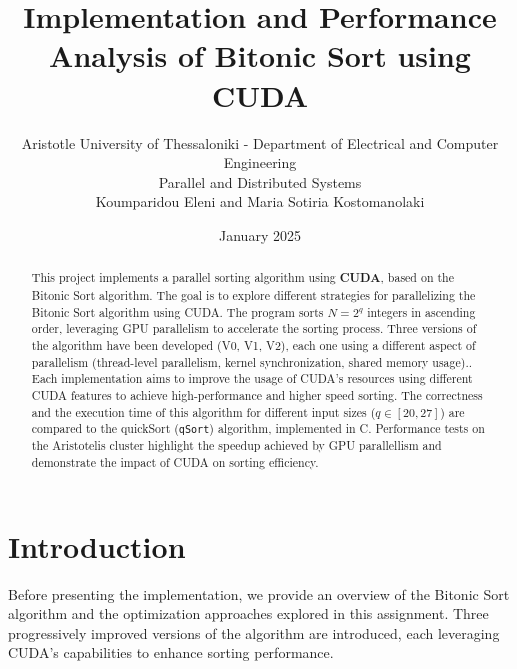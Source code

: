 \documentclass[a4paper,12pt]{article}
\title{Implementation and Performance Analysis of Bitonic Sort using CUDA}
\author{
    \small Aristotle University of Thessaloniki - Department of Electrical and Computer Engineering \\[0.5em]
    \small Parallel and Distributed Systems\\[1.5em]
    Koumparidou Eleni and Maria Sotiria Kostomanolaki \\[1em]
}
\date{January 2025}
\begin{document}
\maketitle

\begin{abstract}
This project implements a parallel sorting algorithm using \textbf{CUDA}, based on the Bitonic Sort algorithm. The goal is to explore different strategies for parallelizing the Bitonic Sort algorithm using CUDA. The program sorts $N = 2^q$ integers in ascending order, leveraging GPU parallelism to accelerate the sorting process. Three versions of the algorithm have been developed (V0, V1, V2), each one using a different aspect of parallelism (thread-level parallelism, kernel synchronization, shared memory usage).. Each implementation aims to improve the usage of CUDA's resources using different CUDA features to achieve high-performance and higher speed sorting. The correctness and the execution time of this algorithm for different input sizes ($q \in [20, 27]$) are compared to the quickSort (\texttt{qSort}) algorithm, implemented in C. Performance tests on the Aristotelis cluster highlight the speedup achieved by GPU parallellism and demonstrate the impact of CUDA on sorting efficiency.
\end{abstract}

\tableofcontents

\section{Introduction}
Before presenting the implementation, we provide an overview of the Bitonic Sort algorithm and the optimization approaches explored in this assignment. Three progressively improved versions of the algorithm are introduced, each leveraging CUDA's capabilities to enhance sorting performance.
\end{document}

